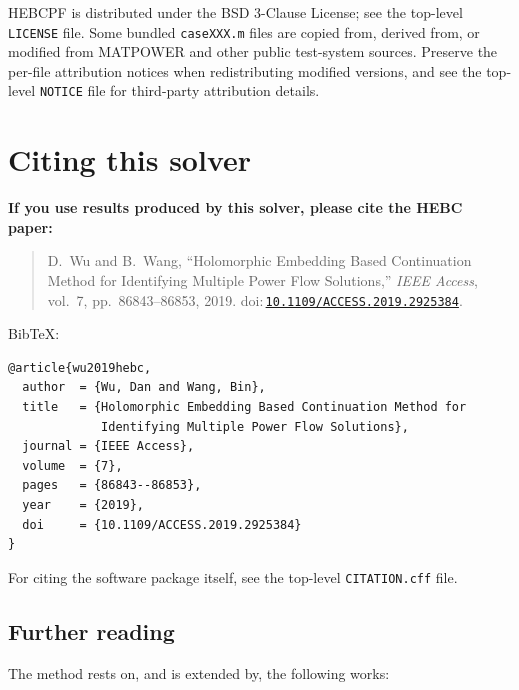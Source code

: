 \documentclass[11pt,a4paper]{article}
\newcommand{\doi}[1]{\href{https://doi.org/#1}{\nolinkurl{#1}}}
\newcommand{\code}[1]{\texttt{#1}}
\begin{document}
HEBCPF is distributed under the BSD 3-Clause License; see the top-level
\code{LICENSE} file. Some bundled \code{caseXXX.m} files are copied from, derived from,
or modified from MATPOWER and other public test-system sources. Preserve the per-file
attribution notices when redistributing modified versions, and see the top-level
\code{NOTICE} file for third-party attribution details.

\section{Citing this solver}\label{sec:cite}

\textbf{If you use results produced by this solver, please cite the HEBC paper:}
\begin{quote}
D.\ Wu and B.\ Wang, ``Holomorphic Embedding Based Continuation Method for Identifying
Multiple Power Flow Solutions,'' \emph{IEEE Access}, vol.~7, pp.~86843--86853, 2019.
doi:\,\doi{10.1109/ACCESS.2019.2925384}.
\end{quote}

BibTeX:
\begin{lstlisting}[style=sh]
@article{wu2019hebc,
  author  = {Wu, Dan and Wang, Bin},
  title   = {Holomorphic Embedding Based Continuation Method for
             Identifying Multiple Power Flow Solutions},
  journal = {IEEE Access},
  volume  = {7},
  pages   = {86843--86853},
  year    = {2019},
  doi     = {10.1109/ACCESS.2019.2925384}
}
\end{lstlisting}

For citing the software package itself, see the top-level \code{CITATION.cff} file.

\subsection*{Further reading}
The method rests on, and is extended by, the following works:
\end{document}

